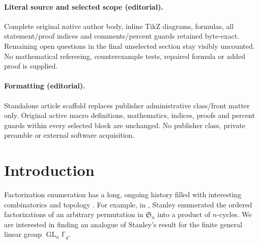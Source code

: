 \documentclass[10pt]{article}
\theoremstyle{definition}
\DeclareMathOperator{\GL}{GL}
\newcommand{\F}{\mathbb{F}}
\newcommand{\FS}{\mathfrak{S}}
\begin{document}
\paragraph{Literal source and selected scope (editorial).} Complete original native author body, inline TikZ diagrams, formulas, all statement/proof indices and comments/percent guards retained byte-exact. Remaining open questions in the final unselected section stay visibly uncounted. No mathematical refereeing, counterexample tests, repaired formula or added proof is supplied.
\paragraph{Formatting (editorial).} Standalone article scaffold replaces publisher administrative class/front matter only. Original active macro definitions, mathematics, indices, proofs and percent guards within every selected block are unchanged. No publisher class, private preamble or external software acquisition.
\clearpage
\section{Introduction}


Factorization enumeration has a long, ongoing history filled with interesting combinatorics and topology \cite{bona_pittel, chapuy_stump, denes, elsv, cacti, jackson_top, vakil}.
For example, in \cite{ncycle}, Stanley enumerated the ordered factorizations of an arbitrary permutation in \(\FS_n\) into a product of \(n\)-cycles.
We are interested in finding an analogue of Stanley's result for the finite general linear group \(\GL_n \F_q\).
\end{document}
